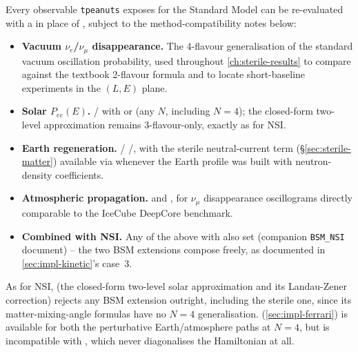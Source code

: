 \begin{implbox}
Every observable \texttt{tpeanuts} exposes for the Standard Model can be
re-evaluated with a  in place of ,
subject to the method-compatibility notes below:
\begin{itemize}
  \item \textbf{Vacuum $\nu_e$/$\nu_\mu$ disappearance.} The 4-flavour
    generalisation of the standard vacuum oscillation probability, used
    throughout \cref{ch:sterile-results} to compare against the textbook
    2-flavour formula and to locate short-baseline experiments in the
    $(L,E)$ plane.
  \item \textbf{Solar $P_{ee}(E)$.} /
     with  or
     (any $N$, including $N=4$); the
    closed-form  two-level
    approximation remains 3-flavour-only, exactly as for NSI.
  \item \textbf{Earth regeneration.}
    /
    /, with the sterile neutral-current
    term (\S\ref{sec:sterile-matter}) available via 
    whenever the Earth profile was built with neutron-density coefficients.
  \item \textbf{Atmospheric propagation.} 
    and , for $\nu_\mu$
    disappearance oscillograms directly comparable to the IceCube DeepCore
    benchmark.
  \item \textbf{Combined with NSI.} Any of the above with 
    also set (companion \texttt{BSM\_NSI} document) -- the two BSM
    extensions compose freely, as documented in \cref{sec:impl-kinetic}'s
    case~3.
\end{itemize}
\end{implbox}

\begin{notebox}
As for NSI,  (the closed-form
two-level solar approximation and its Landau-Zener correction) rejects any
BSM extension outright, including the sterile one, since its
matter-mixing-angle formulas have no $N=4$ generalisation.
 (\cref{sec:impl-ferrari}) is available
for both the perturbative Earth/atmosphere paths at $N=4$, but is
incompatible with , which never diagonalises the
Hamiltonian at all.
\end{notebox}
